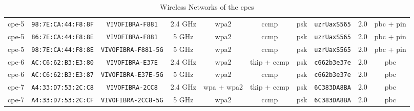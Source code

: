 \begin{landscape}
\begin{table}[h]
{\begin{tabular}{c|c|c|c|c|c|c|c|c|c}
            \gls{cpe}-5 & \texttt{98:7E:CA:44:F8:8F} & \texttt{VIVOFIBRA-F881} & 2.4 \gls{G}\gls{Hz} & \gls{wpa}2 & \gls{ccmp} & \gls{psk} & \texttt{uzrUaxS565} & 2.0 & \gls{pbc} + \gls{pin} \\
            \gls{cpe}-5 & \texttt{86:7E:CA:44:F8:8E} & \texttt{VIVOFIBRA-F881} & 5 \gls{G}\gls{Hz} & \gls{wpa}2 & \gls{ccmp} & \gls{psk} & \texttt{uzrUaxS565} & 2.0 & \gls{pbc} + \gls{pin} \\
            \gls{cpe}-5 & \texttt{98:7E:CA:44:F8:8E} & \texttt{VIVOFIBRA-F881-5G} & 5 \gls{G}\gls{Hz} & \gls{wpa}2 & \gls{ccmp} & \gls{psk} & \texttt{uzrUaxS565} & 2.0 & \gls{pbc} + \gls{pin} \\
            \gls{cpe}-6 & \texttt{AC:C6:62:B3:E3:80} & \texttt{VIVOFIBRA-E37E} & 2.4 \gls{G}\gls{Hz} & \gls{wpa}2 & \gls{tkip} + \gls{ccmp} & \gls{psk} & \texttt{c662b3e37e} & 2.0 & \gls{pbc} \\
            \gls{cpe}-6 & \texttt{AC:C6:62:B3:E3:87} & \texttt{VIVOFIBRA-E37E-5G} & 5 \gls{G}\gls{Hz} & \gls{wpa}2 & \gls{ccmp} & \gls{psk} & \texttt{c662b3e37e} & 2.0 & \gls{pbc} \\
            \gls{cpe}-7 & \texttt{A4:33:D7:53:2C:C8} & \texttt{VIVOFIBRA-2CC8} & 2.4 \gls{G}\gls{Hz} & \gls{wpa} + \gls{wpa}2 & \gls{tkip} + \gls{ccmp} & \gls{psk} & \texttt{6C383DA8BA} & 2.0 & \gls{pbc} \\
            \gls{cpe}-7 & \texttt{A4:33:D7:53:2C:CF} & \texttt{VIVOFIBRA-2CC8-5G} & 5 \gls{G}\gls{Hz} & \gls{wpa}2 & \gls{ccmp} & \gls{psk} & \texttt{6C383DA8BA} & 2.0 & \gls{pbc} \\
        \end{tabular}
    }
    \caption{Wireless Networks of the \gls{cpe}s}
    \label{table:cpes_wlan}
\end{table}

\end{landscape}

\FloatBarrier
